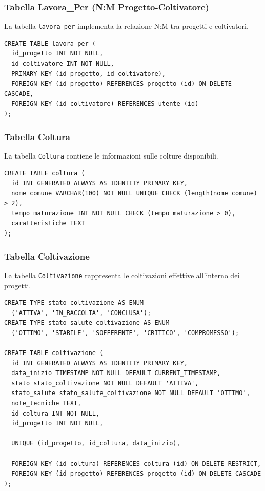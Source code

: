 \documentclass[12pt,a4paper]{article}
\begin{document}
\subsubsection{Tabella Lavora\_Per (N:M Progetto-Coltivatore)}

La tabella \texttt{lavora\_per} implementa la relazione N:M tra progetti e coltivatori.

\begin{lstlisting}[style=sqlstyle]
CREATE TABLE lavora_per (
  id_progetto INT NOT NULL,
  id_coltivatore INT NOT NULL,
  PRIMARY KEY (id_progetto, id_coltivatore),
  FOREIGN KEY (id_progetto) REFERENCES progetto (id) ON DELETE CASCADE,
  FOREIGN KEY (id_coltivatore) REFERENCES utente (id)
);
\end{lstlisting}

\subsubsection{Tabella Coltura}

La tabella \texttt{Coltura} contiene le informazioni sulle colture disponibili.

\begin{lstlisting}[style=sqlstyle]
CREATE TABLE coltura (
  id INT GENERATED ALWAYS AS IDENTITY PRIMARY KEY,
  nome_comune VARCHAR(100) NOT NULL UNIQUE CHECK (length(nome_comune) > 2),
  tempo_maturazione INT NOT NULL CHECK (tempo_maturazione > 0),
  caratteristiche TEXT
);
\end{lstlisting}

\subsubsection{Tabella Coltivazione}

La tabella \texttt{Coltivazione} rappresenta le coltivazioni effettive all'interno dei progetti.

\begin{lstlisting}[style=sqlstyle]
CREATE TYPE stato_coltivazione AS ENUM 
  ('ATTIVA', 'IN_RACCOLTA', 'CONCLUSA');
CREATE TYPE stato_salute_coltivazione AS ENUM 
  ('OTTIMO', 'STABILE', 'SOFFERENTE', 'CRITICO', 'COMPROMESSO');

CREATE TABLE coltivazione (
  id INT GENERATED ALWAYS AS IDENTITY PRIMARY KEY,
  data_inizio TIMESTAMP NOT NULL DEFAULT CURRENT_TIMESTAMP,
  stato stato_coltivazione NOT NULL DEFAULT 'ATTIVA',
  stato_salute stato_salute_coltivazione NOT NULL DEFAULT 'OTTIMO',
  note_tecniche TEXT,
  id_coltura INT NOT NULL,
  id_progetto INT NOT NULL,
  
  UNIQUE (id_progetto, id_coltura, data_inizio),
  
  FOREIGN KEY (id_coltura) REFERENCES coltura (id) ON DELETE RESTRICT,
  FOREIGN KEY (id_progetto) REFERENCES progetto (id) ON DELETE CASCADE
);
\end{lstlisting}
\end{document}
